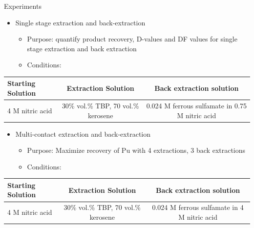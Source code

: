 \documentclass{beamer}
\begin{document}
\begin{frame}{Experiments}
  \begin{itemize}
  \item{Single stage extraction and back-extraction}
    \begin{itemize}
    \item{Purpose: quantify product recovery, D-values and DF values
      for single stage extraction and back extraction}
    \item{Conditions:}
    \end{itemize}
  \end{itemize}
  \begin{center}
    \vskip -0.2cm
    {\fontsize{2.5}{4}\selectfont
      \begin{tabular}{l  c  c}\toprule
        Starting Solution  & Extraction Solution
        & Back extraction solution \\ \midrule \vspace{0.1cm}
        4 M nitric acid & 30\% vol.\% TBP, 70 vol.\% kerosene & 0.024 M ferrous sulfamate in 0.75 M nitric acid \\ \bottomrule
      \end{tabular}
      }
  \end{center}
  \begin{itemize}
  \item{Multi-contact extraction and back-extraction}
    \begin{itemize}
    \item{Purpose: Maximize recovery of Pu with 4 extractions,
      3 back extractions}
    \item{Conditions:}
    \end{itemize}
  \end{itemize}
    \begin{center}
    \vskip -0.2cm
    {\fontsize{2.5}{4}\selectfont
      \begin{tabular}{l  c  c}\toprule
        Starting Solution  & Extraction Solution
        & Back extraction solution \\ \midrule \vspace{0.1cm}
        4 M nitric acid & 30\% vol.\% TBP, 70 vol.\% kerosene & 0.024 M ferrous sulfamate in 4 M nitric acid \\ \bottomrule
      \end{tabular}
      }
  \end{center}
\end{frame}
\end{document}
